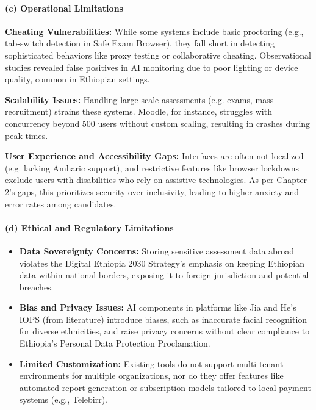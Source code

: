 \paragraph*{(c) Operational Limitations}
\begin{itemize}
    \begin{sloppypar}
        \item \textbf{Cheating Vulnerabilities:} While some systems include basic proctoring (e.g., tab-switch detection in Safe Exam Browser), they fall short in detecting sophisticated behaviors like proxy testing or collaborative cheating. Observational studies revealed false positives in AI monitoring due to poor lighting or device quality, common in Ethiopian settings.
    \end{sloppypar}
    \item \textbf{Scalability Issues:} Handling large-scale assessments (e.g. exams, mass recruitment) strains these systems. Moodle, for instance, struggles with concurrency beyond 500 users without custom scaling, resulting in crashes during peak times.
    \item \textbf{User Experience and Accessibility Gaps:} Interfaces are often not localized (e.g. lacking Amharic support), and restrictive features like browser lockdowns exclude users with disabilities who rely on assistive technologies. As per Chapter 2's gaps, this prioritizes security over inclusivity, leading to higher anxiety and error rates among candidates.
\end{itemize}

\paragraph*{(d) Ethical and Regulatory Limitations}
\begin{itemize}
    \item \textbf{Data Sovereignty Concerns:} Storing sensitive assessment data abroad violates the Digital Ethiopia 2030 Strategy's emphasis on keeping Ethiopian data within national borders, exposing it to foreign jurisdiction and potential breaches.
    \item \textbf{Bias and Privacy Issues:} AI components in platforms like Jia and He's IOPS (from literature) introduce biases, such as inaccurate facial recognition for diverse ethnicities, and raise privacy concerns without clear compliance to Ethiopia's Personal Data Protection Proclamation.
    \item \textbf{Limited Customization:} Existing tools do not support multi-tenant environments for multiple organizations, nor do they offer features like automated report generation or subscription models tailored to local payment systems (e.g., Telebirr).
\end{itemize}

